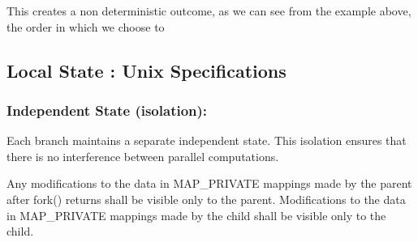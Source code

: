\documentclass[logo,bsc,singlespacing,parskip]{infthesis}
\begin{document}
This creates a non deterministic outcome, as we can see from the example above, the order in which we choose to 

\subsection{Local State : Unix Specifications}

\subsubsection{Independent State (isolation):} 
Each branch maintains a separate independent state. This isolation ensures that there is no interference between parallel computations.



\begin{tcolorbox}[colback=gray!10, colframe=gray!60, sharp corners, boxrule=0.5pt, title={POSIX Base Specifications, Issue 7, p.899}]
    Any modifications to the data in
 MAP\_PRIVATE mappings made by the parent after fork() returns shall be visible only to
 the parent. Modifications to the data in MAP\_PRIVATE mappings made by the child shall
 be visible only to the child.
\end{tcolorbox}
\end{document}
